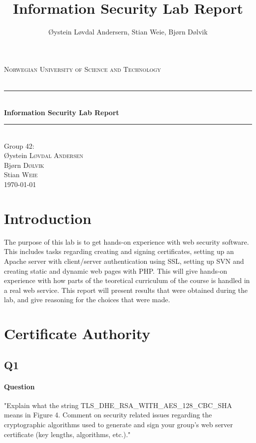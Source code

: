 \documentclass[11pt, a4paper]{article}
\title{Information Security Lab Report}
\author{Øystein Løvdal Andersern, Stian Weie, Bjørn Dølvik}
\newcommand{\HRule}{\rule{\linewidth}{0.5mm}}
\begin{document}
\begin{titlepage}
\begin{center}

\textsc{\LARGE Norwegian University of Science and Technology}\\[1.5cm]

\textsc{\Large }\\[0.5cm]

\HRule \\[0.4cm]
{ \huge \bfseries Information Security Lab Report \\[0.4cm] }

\HRule \\[1.5cm]

{\large Group 42:}\\[0.5cm]

Øystein \textsc{Løvdal Andersen}\\
Bjørn \textsc{Dølvik}\\
Stian \textsc{Weie}\\[4.0cm]

{\large \today}

\end{center}
\end{titlepage}

\tableofcontents
\clearpage

\section{Introduction}
The purpose of this lab is to get hands-on experience with web security software. This includes tasks regarding creating and signing certificates, setting up an Apache server with client/server authentication using SSL, setting up SVN and creating static and dynamic web pages with PHP. This will give hands-on experience with how parts of the teoretical curriculum of the course is handled in a real web service. This report will present results that were obtained during the lab, and give reasoning for the choices that were made. 
\section{Certificate Authority}
\subsection{Q1}
\paragraph{Question}
"Explain what the string TLS\_DHE\_RSA\_WITH\_AES\_128\_CBC\_SHA means in Figure 4. Comment on security related issues regarding the cryptographic algorithms used to generate and sign your group’s web server certificate (key lengths, algorithms, etc.)."
\end{document}
